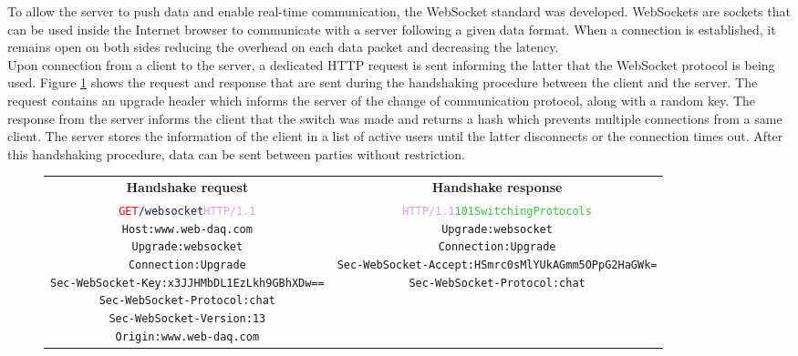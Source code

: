       To allow the server to push data and enable real-time communication, the WebSocket standard was developed. WebSockets are sockets that can be used inside the Internet browser to communicate with a server following a given data format. When a connection is established, it remains open on both sides reducing the overhead on each data packet and decreasing the latency. \\

      Upon connection from a client to the server, a dedicated HTTP request is sent informing the latter that the WebSocket protocol is being used. Figure \ref{fig:III-2-websocket} shows the request and response that are sent during the handshaking procedure between the client and the server. The request contains an upgrade header which informs the server of the change of communication protocol, along with a random key. The response from the server informs the client that the switch was made and returns a hash which prevents multiple connections from a same client. The server stores the information of the client in a list of active users until the latter disconnects or the connection times out. After this handshaking procedure, data can be sent between parties without restriction.

      \begin{figure}[h!]
        \begin{tabularx}{\textwidth}{C{1}C{1}}
          \textbf{Handshake  request} & \textbf{Handshake response} \\
        { \footnotesize
\begin{alltt}
\textcolor{Red}{GET} \textcolor{MidnightBlue}{/websocket} \textcolor{Plum}{HTTP/1.1} \newline
\textcolor{BurntOrange}{Host:} www.web-daq.com \newline
\textcolor{BurntOrange}{Upgrade:} websocket \newline
\textcolor{BurntOrange}{Connection:} Upgrade \newline
\textcolor{BurntOrange}{Sec-WebSocket-Key:} x3JJHMbDL1EzLkh9GBhXDw== \newline
\textcolor{BurntOrange}{Sec-WebSocket-Protocol:} chat \newline
\textcolor{BurntOrange}{Sec-WebSocket-Version:} 13 \newline
\textcolor{BurntOrange}{Origin:} www.web-daq.com
\end{alltt} } & { \footnotesize
\begin{alltt}
\textcolor{Plum}{HTTP/1.1} \textcolor{LimeGreen}{101 Switching Protocols} \newline
\textcolor{BurntOrange}{Upgrade:} websocket \newline
\textcolor{BurntOrange}{Connection:} Upgrade \newline
\textcolor{BurntOrange}{Sec-WebSocket-Accept:} HSmrc0sMlYUkAGmm5OPpG2HaGWk= \newline
\textcolor{BurntOrange}{Sec-WebSocket-Protocol:} chat
\end{alltt} }
        \end{tabularx}
        \caption{}
        \label{fig:III-2-websocket}
      \end{figure}

